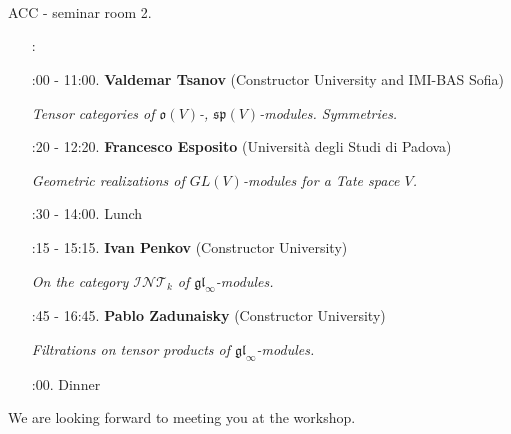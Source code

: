 \documentclass[12pt]{article}
\def\mc {\mathcal}
\def\mk {\mathfrak}
\begin{document}
{\Large
\begin{center}
\hspace{-2.3cm}{\bf WORKSHOP}\\

\vspace{0,5cm}




\\

\vspace{0,5cm}

            \hspace{-2.3cm}{\bf April 25, 2025}\\

\vspace{0,5cm}

            \hspace{-2.3cm}{\bf Constructor University Bremen}
\end{center}
}

\vspace{1cm}

{\Large
\hspace{-2.7cm}{\it Venue:} ACC - seminar room 2.
}

\vspace{1cm}

{\large
\hspace{1,3cm}\begin{enumerate}
\item[\quad{\Large\it Program}:\quad]
\item[\quad\quad 10:00 - 11:00.] {\bf Valdemar Tsanov} (Constructor University and IMI-BAS Sofia)

{\it Tensor categories of $\mk{o}(V)$-, $\mk{sp}(V)$-modules. Symmetries.}
\item[\quad\quad 11:20 - 12:20.] {\bf Francesco Esposito} (Universit\`a degli Studi di Padova)

{\it Geometric realizations of $GL(V)$-modules for a Tate space $V$.}
\item[\quad\quad 12:30 - 14:00.] Lunch
\item[\quad\quad 14:15 - 15:15.] {\bf Ivan Penkov} (Constructor University)

{\it On the category $\mc{INT}_k$ of $\mk{gl}_\infty$-modules.}
\item[\quad\quad 15:45 - 16:45.] {\bf Pablo Zadunaisky} (Constructor University)

{\it Filtrations on tensor products of $\mk{gl}_\infty$-modules.}
\item[\quad\quad 19:00.] Dinner
\end{enumerate}
}

\vspace{2cm}

{\Large
\hspace{-2.3cm}We are looking forward to meeting you at the workshop.
}
\end{document}
